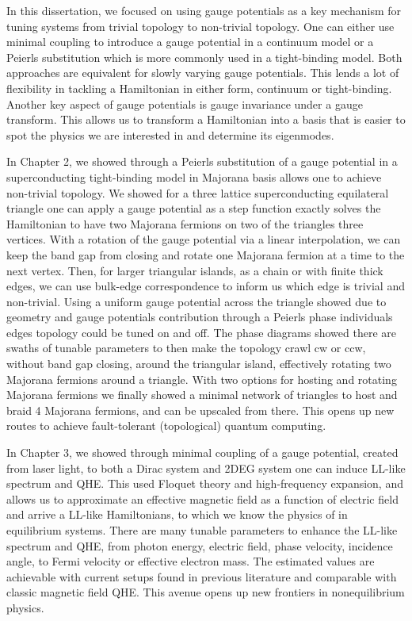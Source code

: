In this dissertation, we focused on using gauge potentials as a key mechanism for tuning systems from trivial topology to non-trivial topology.
One can either use minimal coupling to introduce a gauge potential in a continuum model or a Peierls substitution which is more commonly used in a tight-binding model.
Both approaches are equivalent for slowly varying gauge potentials.
This lends a lot of flexibility in tackling a Hamiltonian in either form, continuum or tight-binding.
Another key aspect of gauge potentials is gauge invariance under a gauge transform.
This allows us to transform a Hamiltonian into a basis that is easier to spot the physics we are interested in and determine its eigenmodes.

In Chapter 2, we showed through a Peierls substitution of a gauge potential in a superconducting tight-binding model in Majorana basis allows one to achieve non-trivial topology.
We showed for a three lattice superconducting equilateral triangle one can apply a gauge potential as a step function exactly solves the Hamiltonian to have two Majorana fermions on two of the triangles three vertices.
With a rotation of the gauge potential via a linear interpolation, we can keep the band gap from closing and rotate one Majorana fermion at a time to the next vertex.
Then, for larger triangular islands, as a chain or with finite thick edges, we can use bulk-edge correspondence to inform us which edge is trivial and non-trivial.
Using a uniform gauge potential across the triangle showed due to geometry and gauge potentials contribution through a Peierls phase individuals edges topology could be tuned on and off.
The phase diagrams showed there are swaths of tunable parameters to then make the topology crawl cw or ccw, without band gap closing, around the triangular island, effectively rotating two Majorana fermions around a triangle.
With two options for hosting and rotating Majorana fermions we finally showed a minimal network of triangles to host and braid 4 Majorana fermions, and can be upscaled from there.
This opens up new routes to achieve fault-tolerant (topological) quantum computing.

In Chapter 3, we showed through minimal coupling of a gauge potential, created from laser light, to both a Dirac system and 2DEG system one can induce LL-like spectrum and QHE.
This used Floquet theory and high-frequency expansion, and allows us to approximate an effective magnetic field as a function of electric field and arrive a LL-like Hamiltonians, to which we know the physics of in equilibrium systems.
There are many tunable parameters to enhance the LL-like spectrum and QHE, from photon energy, electric field, phase velocity, incidence angle, to Fermi velocity or effective electron mass.
The estimated values are achievable with current setups found in previous literature and comparable with classic magnetic field QHE.
This avenue opens up new frontiers in nonequilibrium physics.

